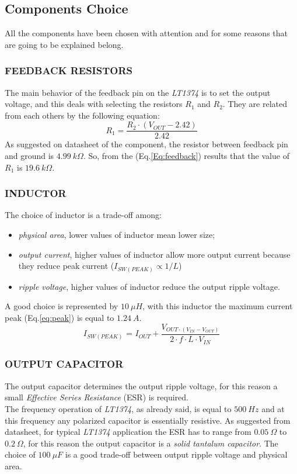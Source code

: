 \subsection{Components Choice}

All the components have been chosen with attention and for some reasons that are going to be explained belong.
\subsubsection{FEEDBACK RESISTORS}
The main behavior of the feedback pin on the \textit{LT1374} is to set the output voltage, and this deals with selecting the resistors $R_1$ and $R_2$. They are related from each others by the following equation:
\begin{equation}
R_1 = \frac{R_2 \cdot \left( V_{OUT} - 2.42\right)}{2.42}
\label{Eq:feedback}
\end{equation}
As suggested on datasheet of the component, the resistor between feedback pin and ground is $4.99\ k\varOmega$. So, from the (Eq.\ref{Eq:feedback}) results that the value of $R_1$ is $19.6\ k\varOmega$.
\subsubsection{INDUCTOR}
The choice of inductor is a trade-off among:
\begin{itemize}
	\item \textit{physical area}, lower values of inductor mean lower size;
	\item \textit{output current}, higher values of inductor allow more output current because they reduce peak current ($I_{SW\left(PEAK\right)} \propto 1/L$)
	\item \textit{ripple voltage}, higher values of inductor reduce the output ripple voltage.
\end{itemize}
A good choice is represented by $10\ \mu H$, with this inductor the maximum current peak (Eq.\ref{eq:peak}) is equal to $1.24\ A$.
\begin{equation}
I_{SW\left(PEAK\right)} \text{ = } I_{OUT} + \frac{V_{OUT \cdot \left(V_{IN} - V_{OUT}\right)}}{2 \cdot f \cdot L \cdot V_{IN}}
\label{eq:peak}
\end{equation}
\subsubsection{OUTPUT CAPACITOR}
The output capacitor determines the output ripple voltage, for this reason a small \textit{Effective Series Resistance} (ESR) is required.\\
The frequency operation of \textit{LT1374}, as already said, is equal to $500\ Hz$ and at this frequency any polarized capacitor is essentially resistive. As suggested from datasheet, for typical \textit{LT1374} application the ESR has to range from $0.05\ \varOmega$ to $0.2\ \varOmega$, for this reason the output capacitor is a \textit{solid tantalum capacitor}. The choice of $100\ \mu F$ is a good trade-off between output ripple voltage and physical area.
